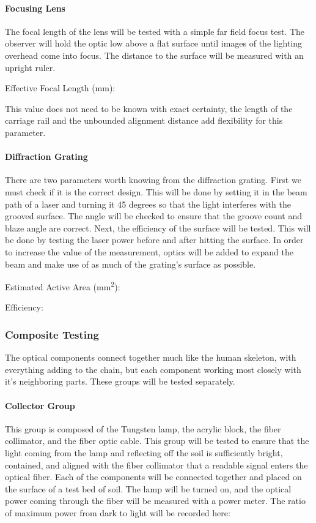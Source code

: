 \paragraph{Focusing Lens} The focal length of the lens will be tested with a simple far field focus test. The observer will hold the optic low above a flat surface until images of the lighting overhead come into focus. The distance to the surface will be measured with an upright ruler.
\bigskip

Effective Focal Length (mm):
\bigskip

This value does not need to be known with exact certainty, the length of the carriage rail and the unbounded alignment distance add flexibility for this parameter.

\paragraph{Diffraction Grating} There are two parameters worth knowing from the diffraction grating. First we must check if it is the correct design. This will be done by setting it in the beam path of a laser and turning it 45 degrees so that the light interferes with the grooved surface. The angle will be checked to ensure that the groove count and blaze angle are correct. Next, the efficiency of the surface will be tested. This will be done by testing the laser power before and after hitting the surface. In order to increase the value of the measurement, optics will be added to expand the beam and make use of as much of the grating’s surface as possible.
\bigskip

Estimated Active Area (mm\textsuperscript{2}):

Efficiency:

\subsubsection{Composite Testing}

The optical components connect together much like the human skeleton, with everything adding to the chain, but each component working most closely with it’s neighboring parts. These groups will be tested separately.

\paragraph{Collector Group} This group is composed of the Tungsten lamp, the acrylic block, the fiber collimator, and the fiber optic cable. This group will be tested to ensure that the light coming from the lamp and reflecting off the soil is sufficiently bright, contained, and aligned with the fiber collimator that a readable signal enters the optical fiber. Each of the components will be connected together and placed on the surface of a test bed of soil. The lamp will be turned on, and the optical power coming through the fiber will be measured with a power meter. The ratio of maximum power from dark to light will be recorded here:
\bigskip

